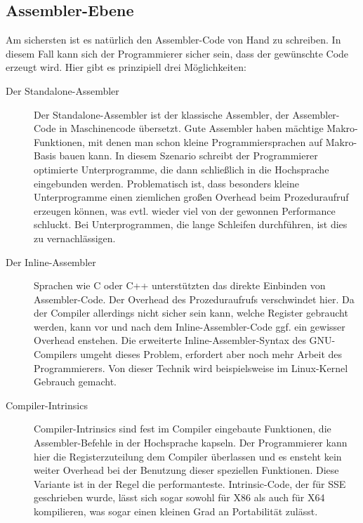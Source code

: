 \documentclass[a4paper,10pt]{article}
\begin{document}
\subsection{Assembler-Ebene}

Am sichersten ist es natürlich den Assembler-Code von Hand zu schreiben. In diesem Fall kann sich
der Programmierer sicher sein, dass der gewünschte Code erzeugt wird. Hier gibt es prinzipiell drei
Möglichkeiten:

\begin{description}

    \item[Der Standalone-Assembler] Der Standalone-Assembler ist der klassische Assembler, der
    Assembler-Code in Maschinencode übersetzt. Gute Assembler haben mächtige Makro-Funktionen, mit
    denen man schon kleine Programmiersprachen auf Makro-Basis bauen kann. In diesem Szenario
    schreibt der Programmierer optimierte Unterprogramme, die dann schließlich in die Hochsprache
    eingebunden werden. Problematisch ist, dass besonders kleine Unterprogramme einen ziemlichen
    großen Overhead beim Prozeduraufruf erzeugen können, was evtl. wieder viel von der gewonnen
    Performance schluckt. Bei Unterprogrammen, die lange Schleifen durchführen, ist dies zu
    vernachlässigen.

    \item[Der Inline-Assembler] Sprachen wie C oder C++ unterstützten das direkte Einbinden von
    Assembler-Code.  Der Overhead des Prozeduraufrufs verschwindet hier. Da der Compiler allerdings
    nicht sicher sein kann, welche Register gebraucht werden, kann vor und nach dem
    Inline-Assembler-Code ggf. ein gewisser Overhead enstehen. Die erweiterte
    Inline-Assembler-Syntax des GNU-Compilers umgeht dieses Problem, erfordert aber noch mehr
    Arbeit des Programmierers. Von dieser Technik wird beispielsweise im Linux-Kernel Gebrauch
    gemacht.

    \item[Compiler-Intrinsics] Compiler-Intrinsics sind fest im Compiler eingebaute Funktionen, die
    Assembler-Befehle in der Hochsprache kapseln. Der Programmierer kann hier die Registerzuteilung
    dem Compiler überlassen und es ensteht kein weiter Overhead bei der Benutzung dieser speziellen
    Funktionen. Diese Variante ist in der Regel die performanteste.  Intrinsic-Code, der für SSE
    geschrieben wurde, lässt sich sogar sowohl für X86 als auch für X64 kompilieren, was sogar einen
    kleinen Grad an Portabilität zulässt.

\end{description}
\end{document}
